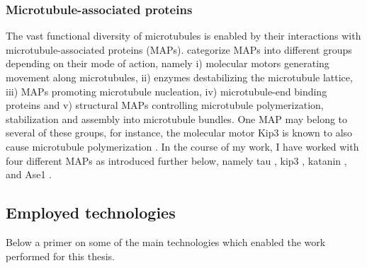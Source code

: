 \subsubsection{Microtubule-associated proteins}
\label{sec:MAPs}
The vast functional diversity of microtubules is enabled by their interactions with microtubule-associated proteins (MAPs). \cite{BODAKUNTLA2019804} categorize MAPs into different groups depending on their mode of action, namely i) molecular motors generating movement along microtubules, ii) enzymes destabilizing the microtubule lattice, iii) MAPs promoting microtubule nucleation, iv) microtubule-end binding proteins and v) structural MAPs controlling microtubule polymerization, stabilization and assembly into microtubule bundles. One MAP may belong to several of these groups, for instance, the molecular motor Kip3 is known to also cause microtubule polymerization \parencite{Gardner2011a}. In the course of my work, I have worked with four different MAPs as introduced further below, namely tau , kip3 , katanin , and Ase1 . 

\subsection{Employed technologies}
\label{sec:methods_intro}
Below a primer on some of the main technologies which enabled the work performed for this thesis.

